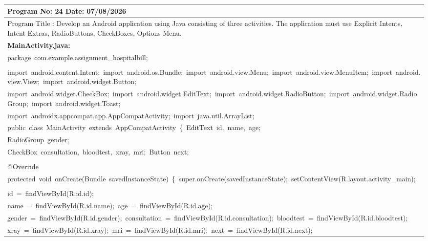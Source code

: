\documentclass[a4paper,12pt]{article}
\begin{document}
\begin{longtable}{|p{}|}
\hline\endfirsthead\hline\endhead\hline\endfoot\hline\endlastfoot
\rule{0pt}{13pt}Program No: 24 \hfill Date: 07/08/2026 \\
\hline
\rule{0pt}{13pt}Program Title : Develop an Android application using Java consisting of three activities. The application must use Explicit Intents, Intent Extras, RadioButtons, CheckBoxes, Options Menu. \\
\hline
\rule{0pt}{13pt}\textbf{MainActivity.java:} \\
\hline
{\ttfamily\small package\ com.example.assignment\_hospitalbill;} \\
\strut \\
{\ttfamily\small import\ android.content.Intent;\ import\ android.os.Bundle;\ import\ android.view.Menu;\ import\ android.view.MenuItem;\ import\ android.view.View;\ import\ android.widget.Button;} \\
{\ttfamily\small import\ android.widget.CheckBox;\ import\ android.widget.EditText;\ import\ android.widget.RadioButton;\ import\ android.widget.RadioGroup;\ import\ android.widget.Toast;} \\
{\ttfamily\small import\ androidx.appcompat.app.AppCompatActivity;\ import\ java.util.ArrayList;} \\
{\ttfamily\small public\ class\ MainActivity\ extends\ AppCompatActivity\ \{\ EditText\ id,\ name,\ age;} \\
{\ttfamily\small RadioGroup\ gender;} \\
{\ttfamily\small CheckBox\ consultation,\ bloodtest,\ xray,\ mri;\ Button\ next;} \\
\strut \\
{\ttfamily\small @Override} \\
{\ttfamily\small protected\ void\ onCreate(Bundle\ savedInstanceState)\ \{\ super.onCreate(savedInstanceState);\ setContentView(R.layout.activity\_main);} \\
\strut \\
{\ttfamily\small id\ =\ findViewById(R.id.id);} \\
{\ttfamily\small name\ =\ findViewById(R.id.name);\ age\ =\ findViewById(R.id.age);} \\
{\ttfamily\small gender\ =\ findViewById(R.id.gender);\ consultation\ =\ findViewById(R.id.consultation);\ bloodtest\ =\ findViewById(R.id.bloodtest);} \\
{\ttfamily\small xray\ =\ findViewById(R.id.xray);\ mri\ =\ findViewById(R.id.mri);\ next\ =\ findViewById(R.id.next);} \\

\end{longtable}
\end{document}
